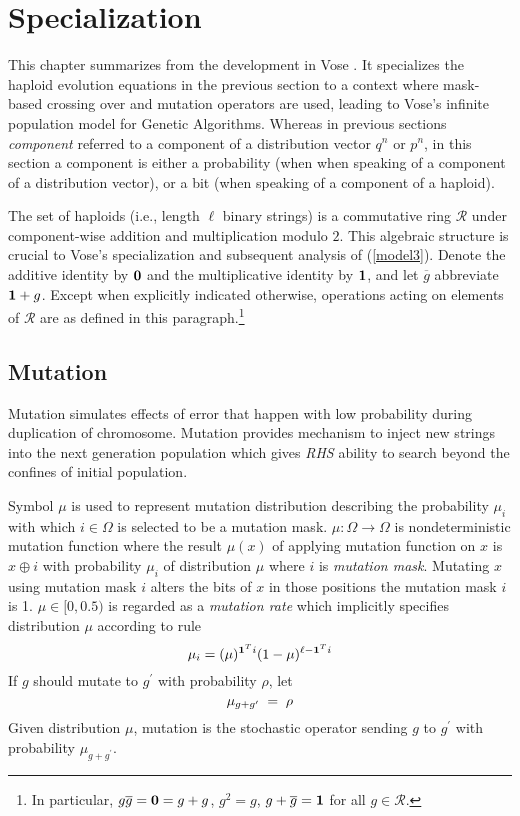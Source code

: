 \chapter{Specialization}\label{ch:specialize}
This chapter summarizes from the development in Vose \cite{Vose1999}.
It specializes the haploid evolution equations in the previous section 
to a context where mask-based crossing over and mutation operators are used, 
leading to Vose's infinite population model for Genetic Algorithms.  Whereas 
in previous sections {\em component} referred to a component
of a distribution vector $q^n$ or $p^n$, in this section a component
is either a probability (when when speaking of a component of a
distribution vector), or a bit (when speaking of a component of a
haploid).

The set of haploids (i.e., length $\ell$ binary strings) is a
commutative ring $\mathcal{R}$ under component-wise addition and
multiplication modulo $2$.  This algebraic structure is crucial to
Vose's specialization and subsequent analysis of
(\ref{model3}). Denote the additive identity by ${\bf 0}$ and the
multiplicative identity by ${\bf 1}$, and let $\overline{g}$
abbreviate ${\bf 1} + g$.  Except when explicitly indicated otherwise,
operations acting on elements of $\mathcal{R}$ are as defined in this
paragraph.\footnote{In particular, $g \overline{g} = {\bf 0} = g+g$,
  $g^2 = g$, $g + \overline{g} = {\bf 1}$ for all $g \in
  \mathcal{R}$.}

\section{Mutation}
Mutation simulates effects of error that happen with low probability during duplication of chromosome. Mutation provides mechanism to inject new strings into the next generation population which gives {\em RHS} ability to search beyond the confines of initial population.

Symbol $\mu$ is used to represent mutation distribution describing the probability $\mu_i$ with which $i \in \Omega$ is selected to be a mutation mask. $\mu : \Omega \rightarrow \Omega$ is nondeterministic mutation function where the result $\mu(x)$ of applying mutation function on $x$ is $x \oplus i$ with probability $\mu_i$ of distribution $\mu$ where $i$ is {\em mutation mask}. Mutating $x$ using mutation mask $i$ alters the bits of $x$ in those positions the mutation mask $i$ is 1.
$\mu \in [0, 0.5)$ is regarded as a {\em mutation rate} which implicitly specifies distribution $\mu$ according to rule \cite{Vose1999}
\[
\mu_i = (\mu)^{{\bf 1}^Ti} (1-\mu)^{\ell- {\bf 1}^Ti}
\]
If $g$ should mutate to $g^\prime$ with probability $\rho$,
let\\[-0.2in]
\[
\mu_{g + g^\prime} \; = \; \rho\\[0.05in]
\]
Given distribution $\mu$, mutation is the stochastic operator sending
$g$ to $g^\prime$ with probability $\mu_{g + g^\prime}$.

